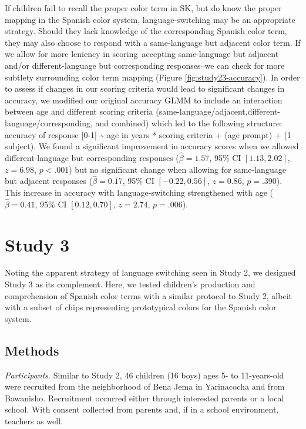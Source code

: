 \documentclass[
  english,
  ,man,floatsintext]{apa6}
\begin{document}
If children fail to recall the proper color term in SK, but do know the proper mapping in the Spanish color system, language-switching may be an appropriate strategy. Should they lack knowledge of the corresponding Spanish color term, they may also choose to respond with a same-language but adjacent color term. If we allow for more leniency in scoring--accepting same-language but adjacent and/or different-language but corresponding responses--we can check for more subtlety surrounding color term mapping (Figure \ref{fig:study23-accuracy}). In order to assess if changes in our scoring criteria would lead to significant changes in accuracy, we modified our original accuracy GLMM to include an interaction between age and different scoring criteria (same-language/adjacent,different-language/corresponding, and combined) which led to the following structure: accuracy of response {[}0-1{]} \textasciitilde{} age in years * scoring criteria + (age \textbar{} prompt) + (1 \textbar{} subject). We found a significant improvement in accuracy scores when we allowed different-language but corresponding responses (\(\hat{\beta} = 1.57\), 95\% CI \([1.13, 2.02]\), \(z = 6.98\), \(p < .001\)) but no significant change when allowing for same-language but adjacent responses (\(\hat{\beta} = 0.17\), 95\% CI \([-0.22, 0.56]\), \(z = 0.86\), \(p = .390\)). This increase in accuracy with language-switching strengthened with age (\(\hat{\beta} = 0.41\), 95\% CI \([0.12, 0.70]\), \(z = 2.74\), \(p = .006\)).

\hypertarget{study-3}{%
\section{Study 3}\label{study-3}}

Noting the apparent strategy of language switching seen in Study 2, we designed Study 3 as its complement. Here, we tested children's production and comprehension of Spanish color terms with a similar protocol to Study 2, albeit with a subset of chips representing prototypical colors for the Spanish color system.

\hypertarget{methods-2}{%
\subsection{Methods}\label{methods-2}}

\emph{Participants}. Similar to Study 2, 46 children (16 boys) ages 5- to 11-years-old were recruited from the neighborhood of Bena Jema in Yarinacocha and from Bawanisho. Recruitment occurred either through interested parents or a local school. With consent collected from parents and, if in a school environment, teachers as well.
\end{document}
